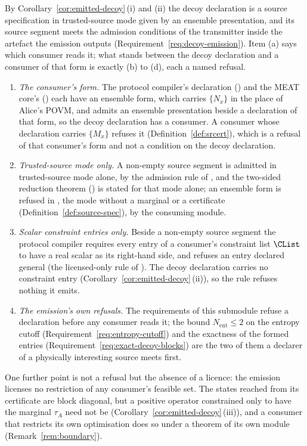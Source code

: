 \begin{remark}\label{rem:decoy-consumers}
By Corollary~\ref{cor:emitted-decoy}\,(i) and (ii) the decoy declaration is a
source specification in trusted-source mode given by an ensemble presentation,
and its source segment meets the admission conditions of the transmitter inside
the artefact the emission outputs (Requirement~\ref{req:decoy-emission}). Item
(a) says which consumer reads it; what stands between the decoy declaration and
a consumer of that form is exactly (b) to (d), each a named refusal.
\begin{enumerate}[label=(\alph*),leftmargin=2.2em]
\item \emph{The consumer's form.} The protocol compiler's declaration
() and the MEAT core's
() each have an ensemble form, which carries
$\{N_x\}$ in the place of Alice's POVM, and
 admits an ensemble presentation beside a
declaration of that form, so the decoy declaration has a consumer. A consumer
whose declaration carries $\{M_x\}$ refuses it (Definition~\ref{def:srcert}),
which is a refusal of that consumer's form and not a condition on the decoy
declaration.
\item \emph{Trusted-source mode only.} A non-empty source segment is admitted in
trusted-source mode alone, by the admission rule of ,
and the two-sided reduction theorem () is stated
for that mode alone; an ensemble form is refused in
, the
mode without a marginal or a certificate (Definition~\ref{def:source-spec}), by
the consuming module.
\item \emph{Scalar constraint entries only.} Beside a non-empty source segment
the protocol compiler requires every entry of a consumer's constraint list
$\CList$ to have a real scalar as its right-hand side, and refuses an entry
declared general (the licensed-only rule of
). The decoy declaration carries no
constraint entry (Corollary~\ref{cor:emitted-decoy}\,(ii)), so the rule refuses
nothing it emits.
\item \emph{The emission's own refusals.} The requirements of this submodule
refuse a declaration before any consumer reads it; the bound
$N_{\mathrm{ent}}\le2$ on the entropy cutoff
(Requirement~\ref{req:entropy-cutoff}) and the exactness of the formed entries
(Requirement~\ref{req:exact-decoy-blocks}) are the two of them a declarer of a
physically interesting source meets first.
\end{enumerate}
One further point is not a refusal but the absence of a licence: the emission
licenses no restriction of any consumer's feasible set. The states reached from
its certificate are block diagonal, but a positive operator constrained only to
have the marginal $\tau_A$ need not be (Corollary~\ref{cor:emitted-decoy}\,(iii)),
and a consumer that restricts its own optimisation does so under a theorem of
its own module (Remark~\ref{rem:boundary}).
\end{remark}
